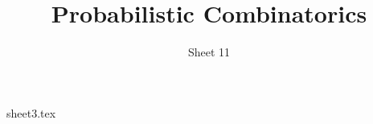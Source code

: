 \documentclass[a4paper, 11pt]{article}
\title{Probabilistic Combinatorics}
\author{Sheet 11}
\begin{document}

\maketitle

{sheet3.tex}
\end{document}
